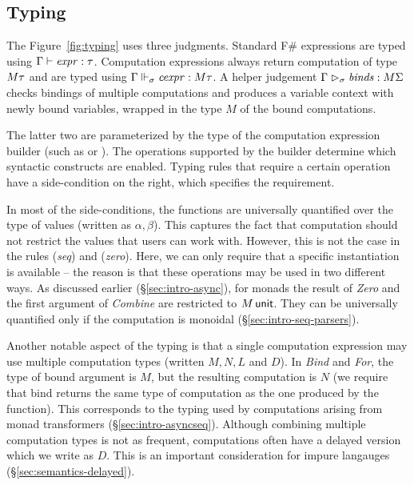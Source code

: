 \documentclass[runningheads,a4paper]{llncs}
\begin{document}

\subsection{Typing}
\label{sec:semantics-typing}

The Figure~\ref{fig:typing} uses three judgments. Standard F\# 
expressions are typed using $\Gamma \vdash \textnormal{\emph{expr}} : \tau$. Computation expressions always return
computation of type $M \tau$ and are typed using $\Gamma \Vdash_\sigma \textnormal{\emph{cexpr}} : M \tau$.
A helper judgement $\Gamma \vartriangleright_\sigma \textnormal{\emph{binds}} : M \Sigma$ checks bindings
of multiple computations and produces a variable context with newly bound variables, 
wrapped in the type $M$ of the bound computations.

The latter two are parameterized by the type of the computation expression builder (such as
 or ). The operations supported by the builder determine which syntactic
constructs are enabled. Typing rules that require a certain operation have a side-condition
on the right, which specifies the requirement.

In most of the side-conditions, the functions are universally quantified over the type of values
(written as $\alpha, \beta$). This captures the fact that computation should not restrict the 
values that users can work with. However, this is not the case in the rules (\emph{seq}) and 
(\emph{zero}). Here, we can only require that a specific instantiation is available -- the reason 
is that these operations may be used in two different ways. As discussed earlier (\S\ref{sec:intro-async}), 
for monads the result of \emph{Zero} and the first argument of \emph{Combine} are restricted to
$M\,\textnormal{\sffamily unit}$. They can be universally quantified only if the computation is monoidal 
(\S\ref{sec:intro-seq-parsers}).

Another notable aspect of the typing is that a single computation expression may use multiple
computation types (written $M, N, L$ and $D$). In \emph{Bind} and \emph{For}, the type of bound
argument is $M$, but the resulting computation is $N$ (we require that bind returns the same
type of computation as the one produced by the function). This corresponds to the typing used
by computations arising from monad transformers (\S\ref{sec:intro-asyncseq}). Although combining
multiple computation types is not as frequent, computations often have a delayed version which
we write as $D$. This is an important consideration for impure langauges (\S\ref{sec:semantics-delayed}).
\end{document}
